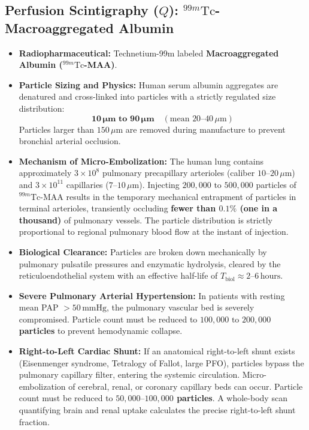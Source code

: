 \documentclass[11pt,a4paper]{article}
\begin{document}
\subsection{Perfusion Scintigraphy (\texorpdfstring{$Q$}{Q}): \texorpdfstring{$^{99m}\text{Tc}$}{99mTc}-Macroaggregated Albumin}

\begin{itemize}[leftmargin=*]
    \item \textbf{Radiopharmaceutical:} Technetium-99m labeled \textbf{Macroaggregated Albumin ($^{99m}\text{Tc}$-MAA)}.
    \item \textbf{Particle Sizing and Physics:} Human serum albumin aggregates are denatured and cross-linked into particles with a strictly regulated size distribution:
    \begin{equation}
        \mathbf{10\,\mu\text{m} \text{ to } 90\,\mu\text{m}} \quad (\text{mean } 20\text{--}40\,\mu\text{m})
    \end{equation}
    Particles larger than $150\,\mu\text{m}$ are removed during manufacture to prevent bronchial arterial occlusion.
    \item \textbf{Mechanism of Micro-Embolization:} The human lung contains approximately $3 \times 10^8$ pulmonary precapillary arterioles (caliber $10\text{--}20\,\mu\text{m}$) and $3 \times 10^{11}$ capillaries ($7\text{--}10\,\mu\text{m}$). Injecting $200{,}000\text{ to }500{,}000$ particles of $^{99m}\text{Tc}$-MAA results in the temporary mechanical entrapment of particles in terminal arterioles, transiently occluding \textbf{fewer than $0.1\%$ (one in a thousand)} of pulmonary vessels. The particle distribution is strictly proportional to regional pulmonary blood flow at the instant of injection.
    \item \textbf{Biological Clearance:} Particles are broken down mechanically by pulmonary pulsatile pressures and enzymatic hydrolysis, cleared by the reticuloendothelial system with an effective half-life of $T_{\text{biol}} \approx 2\text{--}6\,\text{hours}$.
\end{itemize}

\begin{safetybox}
\begin{itemize}[leftmargin=*]
    \item \textbf{Severe Pulmonary Arterial Hypertension:} In patients with resting mean PAP $> 50\,\text{mmHg}$, the pulmonary vascular bed is severely compromised. Particle count must be reduced to \textbf{$100{,}000\text{ to }200{,}000$ particles} to prevent hemodynamic collapse.
    \item \textbf{Right-to-Left Cardiac Shunt:} If an anatomical right-to-left shunt exists (Eisenmenger syndrome, Tetralogy of Fallot, large PFO), particles bypass the pulmonary capillary filter, entering the systemic circulation. Micro-embolization of cerebral, renal, or coronary capillary beds can occur. Particle count must be reduced to \textbf{$50{,}000\text{--}100{,}000$ particles}. A whole-body scan quantifying brain and renal uptake calculates the precise right-to-left shunt fraction.
\end{itemize}
\end{safetybox}
\end{document}
